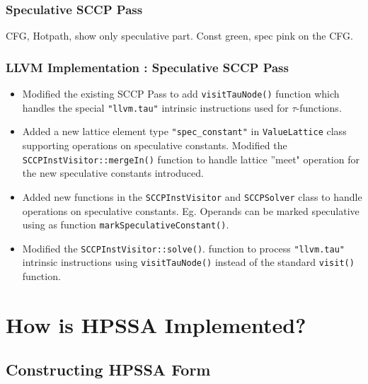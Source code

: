 \documentclass[aspectratio=169]{beamer}
\begin{document}
\begin{frame}
	\frametitle{Speculative SCCP Pass}
	CFG, Hotpath, show only speculative part. Const green, spec pink on the CFG. 
\end{frame}
\begin{frame}
	\frametitle{LLVM Implementation : Speculative SCCP Pass}
	\begin{itemize}
		\item Modified the existing SCCP Pass to add \texttt{visitTauNode()} function which handles the special \texttt{"llvm.tau"} intrinsic instructions used for $\tau$-functions.\footnotemark
		\item Added a new lattice element type \texttt{"spec_constant"} in \texttt{ValueLattice} class supporting operations on speculative constants. Modified the \texttt{SCCPInstVisitor::mergeIn()} function to handle lattice ''meet" operation for the new speculative constants introduced.
		\item Added new functions in the \texttt{SCCPInstVisitor} and \texttt{SCCPSolver} class to handle operations on speculative constants. Eg. Operands can be marked speculative using as function \texttt{markSpeculativeConstant()}.
		\item Modified the \texttt{SCCPInstVisitor::solve()}. function to process \texttt{"llvm.tau"} intrinsic instructions using \texttt{visitTauNode()} instead of the standard \texttt{visit()} function.
	\end{itemize}
	\tiny 
\end{frame}
\footnotesize

\section{How is HPSSA Implemented?}
\subsection{Constructing HPSSA Form}
{
	
}
\end{document}
